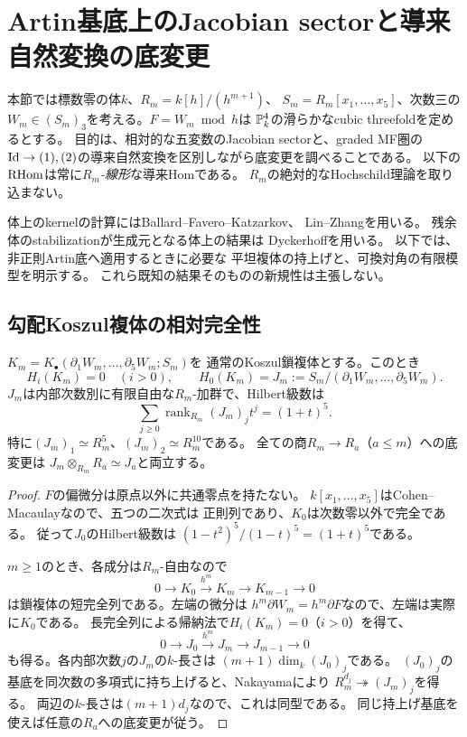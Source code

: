 \section{Artin基底上のJacobian sectorと導来自然変換の底変更}
\label{ras:sec:artin-sector}

本節では標数零の体$k$、$R_m=k[h]/(h^{m+1})$、
$S_m=R_m[x_1,\ldots,x_5]$、次数三の
$W_m\in(S_m)_3$を考える。$F=W_m\bmod h$は
$\mathbb P^4_k$の滑らかなcubic threefoldを定めるとする。
目的は、相対的な五変数のJacobian sectorと、graded MF圏の
$\operatorname{Id}\to(1),(2)$の導来自然変換を区別しながら底変更を調べることである。
以下の$\operatorname{RHom}$は常に\emph{$R_m$-線形}な導来Homである。
$R_m$の絶対的なHochschild理論を取り込まない。

体上のkernelの計算にはBallard--Favero--Katzarkov\cite{RASBFK}、
Lin--Zhang\cite[Theorem~3.5, Remark~3.6]{RASLZ}を用いる。
残余体のstabilizationが生成元となる体上の結果は
Dyckerhoff\cite{RASDyck}を用いる。
以下では、非正則Artin底へ適用するときに必要な
平坦複体の持上げと、可換対角の有限模型を明示する。
これら既知の結果そのものの新規性は主張しない。

\subsection{勾配Koszul複体の相対完全性}

\begin{lemma}[勾配の全Artin完全性]\label{ras:lem:gradient}
$K_m=K_\bullet(\partial_1W_m,\ldots,\partial_5W_m;S_m)$を
通常のKoszul鎖複体とする。このとき
\[
 H_i(K_m)=0\quad(i>0),\qquad
 H_0(K_m)=J_m:=S_m/(\partial_1W_m,\ldots,\partial_5W_m).
\]
$J_m$は内部次数別に有限自由な$R_m$-加群で、Hilbert級数は
\[
 \sum_{j\ge0}\operatorname{rank}_{R_m}(J_m)_jt^j=(1+t)^5.
 \tag{RAS1}\label{ras:eq:hilbert}
\]
特に$(J_m)_1\simeq R_m^5$、$(J_m)_2\simeq R_m^{10}$である。
全ての商$R_m\to R_a$（$a\le m$）への底変更は
$J_m\otimes_{R_m}R_a\simeq J_a$と両立する。
\end{lemma}
\begin{proof}
$F$の偏微分は原点以外に共通零点を持たない。
$k[x_1,\ldots,x_5]$はCohen--Macaulayなので、五つの二次式は
正則列であり、$K_0$は次数零以外で完全である。
従って$J_0$のHilbert級数は
$(1-t^2)^5/(1-t)^5=(1+t)^5$である。

$m\ge1$のとき、各成分は$R_m$-自由なので
\[
 0\longrightarrow K_0\xrightarrow{h^m}K_m
 \longrightarrow K_{m-1}\longrightarrow0
 \tag{RAS2}\label{ras:eq:short}
\]
は鎖複体の短完全列である。左端の微分は
$h^m\partial W_m=h^m\partial F$なので、左端は実際に$K_0$である。
長完全列による帰納法で$H_i(K_m)=0$（$i>0$）を得て、
\[
 0\longrightarrow J_0\xrightarrow{h^m}J_m
 \longrightarrow J_{m-1}\longrightarrow0
\]
も得る。各内部次数$j$の$J_m$の$k$-長さは
$(m+1)\dim_k(J_0)_j$である。
$(J_0)_j$の基底を同次数の多項式に持ち上げると、Nakayamaにより
$R_m^{d_j}\twoheadrightarrow(J_m)_j$を得る。
両辺の$k$-長さは$(m+1)d_j$なので、これは同型である。
同じ持上げ基底を使えば任意の$R_a$への底変更が従う。
\end{proof}

